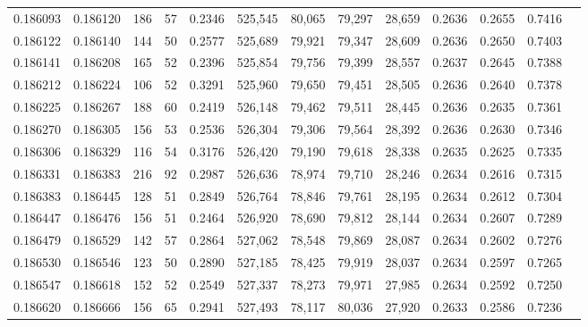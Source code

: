 \begin{tabular}{rrrrrrrrrrrrr}
0.186093 & 0.186120 &   186 &  57 &                                     0.2346 & 525,545 &  80,065 &  79,297 &  28,659 & 0.2636 & 0.2655 & 0.7416 \\
0.186122 & 0.186140 &   144 &  50 &                                     0.2577 & 525,689 &  79,921 &  79,347 &  28,609 & 0.2636 & 0.2650 & 0.7403 \\
0.186141 & 0.186208 &   165 &  52 &                                     0.2396 & 525,854 &  79,756 &  79,399 &  28,557 & 0.2637 & 0.2645 & 0.7388 \\
0.186212 & 0.186224 &   106 &  52 &                                     0.3291 & 525,960 &  79,650 &  79,451 &  28,505 & 0.2636 & 0.2640 & 0.7378 \\
0.186225 & 0.186267 &   188 &  60 &                                     0.2419 & 526,148 &  79,462 &  79,511 &  28,445 & 0.2636 & 0.2635 & 0.7361 \\
0.186270 & 0.186305 &   156 &  53 &                                     0.2536 & 526,304 &  79,306 &  79,564 &  28,392 & 0.2636 & 0.2630 & 0.7346 \\
0.186306 & 0.186329 &   116 &  54 &                                     0.3176 & 526,420 &  79,190 &  79,618 &  28,338 & 0.2635 & 0.2625 & 0.7335 \\
0.186331 & 0.186383 &   216 &  92 &                                     0.2987 & 526,636 &  78,974 &  79,710 &  28,246 & 0.2634 & 0.2616 & 0.7315 \\
0.186383 & 0.186445 &   128 &  51 &                                     0.2849 & 526,764 &  78,846 &  79,761 &  28,195 & 0.2634 & 0.2612 & 0.7304 \\
0.186447 & 0.186476 &   156 &  51 &                                     0.2464 & 526,920 &  78,690 &  79,812 &  28,144 & 0.2634 & 0.2607 & 0.7289 \\
0.186479 & 0.186529 &   142 &  57 &                                     0.2864 & 527,062 &  78,548 &  79,869 &  28,087 & 0.2634 & 0.2602 & 0.7276 \\
0.186530 & 0.186546 &   123 &  50 &                                     0.2890 & 527,185 &  78,425 &  79,919 &  28,037 & 0.2634 & 0.2597 & 0.7265 \\
0.186547 & 0.186618 &   152 &  52 &                                     0.2549 & 527,337 &  78,273 &  79,971 &  27,985 & 0.2634 & 0.2592 & 0.7250 \\
0.186620 & 0.186666 &   156 &  65 &                                     0.2941 & 527,493 &  78,117 &  80,036 &  27,920 & 0.2633 & 0.2586 & 0.7236 \\

\end{tabular}
